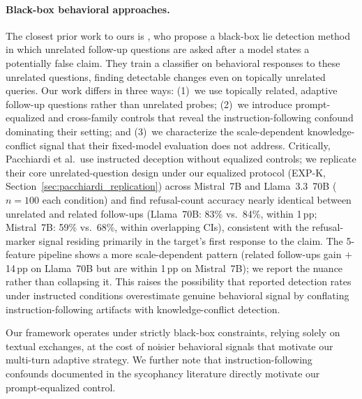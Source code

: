 \paragraph{Black-box behavioral approaches.} The closest prior work to ours is \citet{pacchiardi2023catch}, who propose a black-box lie detection method in which unrelated follow-up questions are asked after a model states a potentially false claim. They train a classifier on behavioral responses to these unrelated questions, finding detectable changes even on topically unrelated queries. Our work differs in three ways: (1)~we use topically related, adaptive follow-up questions rather than unrelated probes; (2)~we introduce prompt-equalized and cross-family controls that reveal the instruction-following confound dominating their setting; and (3)~we characterize the scale-dependent knowledge-conflict signal that their fixed-model evaluation does not address. Critically, Pacchiardi et al.\ use instructed deception without equalized controls; we replicate their core unrelated-question design under our equalized protocol (EXP-K, Section~\ref{sec:pacchiardi_replication}) across Mistral~7B and Llama~3.3~70B ($n=100$ each condition) and find refusal-count accuracy nearly identical between unrelated and related follow-ups (Llama~70B: 83\% vs.\ 84\%, within 1\,pp; Mistral~7B: 59\% vs.\ 68\%, within overlapping CIs), consistent with the refusal-marker signal residing primarily in the target's first response to the claim. The 5-feature pipeline shows a more scale-dependent pattern (related follow-ups gain $+$14\,pp on Llama~70B but are within 1\,pp on Mistral~7B); we report the nuance rather than collapsing it. This raises the possibility that reported detection rates under instructed conditions overestimate genuine behavioral signal by conflating instruction-following artifacts with knowledge-conflict detection.

Our framework operates under strictly black-box constraints, relying solely on textual exchanges, at the cost of noisier behavioral signals that motivate our multi-turn adaptive strategy. We further note that instruction-following confounds documented in the sycophancy literature \cite{sharma2023sycophancy} directly motivate our prompt-equalized control.


